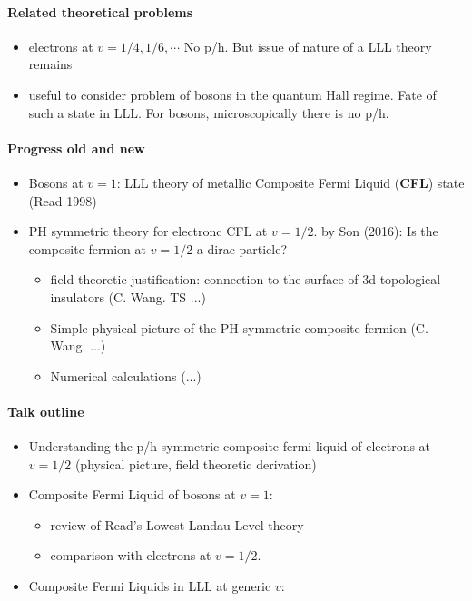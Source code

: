 \documentclass{article}
\numberwithin{equation}{subsection} %
\theoremstyle{definition}
\begin{document}
\paragraph{Related theoretical problems}
\begin{itemize}
    \item electrons at $v=1/4,1/6,\cdots$ No p/h. But issue of nature of a
        LLL theory remains
    \item useful to consider problem of bosons in the quantum Hall regime.
        Fate of such a state in LLL. For bosons, microscopically there is
        no p/h.
\end{itemize}
\paragraph{Progress old and new}
\begin{itemize}
    \item Bosons at $v=1$: LLL theory of metallic Composite Fermi Liquid
        (\textbf{CFL}) state (Read 1998)
    \item PH symmetric theory for electronc CFL at $v=1/2$.
        by Son (2016): Is the composite fermion at $v=1/2$ a dirac
        particle?
        \begin{itemize}
            \item field theoretic justification: connection to the surface
                of 3d topological insulators (C. Wang. TS ...)
            \item Simple physical picture of the PH symmetric composite
                fermion (C. Wang. ...)
            \item Numerical calculations (...)
        \end{itemize}
\end{itemize}
\paragraph{Talk outline}
\begin{itemize}
    \item Understanding the p/h symmetric composite fermi liquid of
        electrons at $v=1/2$ (physical picture, field theoretic
        derivation)
    \item Composite Fermi Liquid of bosons at $v=1$:
        \begin{itemize}
            \item review of Read's Lowest Landau Level theory
            \item comparison with electrons at $v=1/2$.
        \end{itemize}
    \item Composite Fermi Liquids in LLL at generic $v$:
\end{itemize}
\end{document}
